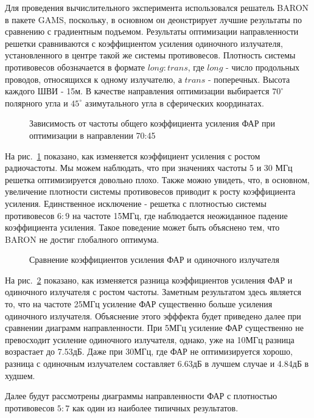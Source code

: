 Для проведения вычислительного эксперимента использовался решатель BARON в пакете GAMS, поскольку, в основном он деонстрирует лучшие результаты по сравнению с градиентным подъемом. Результаты оптимизации направленности решетки сравниваются с коэффициентом усиления одиночного излучателя, установленного в центре такой же системы противовесов. Плотность системы противовесов обозначается в формате $long:trans$, где $long$ - число продольных проводов, относящихся к одному излучателю, а $trans$ - поперечных. Высота каждого ШВИ - 15м. В качестве направления оптимизации выбирается $70^{\circ}$ полярного угла и $45^{\circ}$ азимутального угла в сферических координатах.

\begin{figure}
\caption{Зависимость от частоты общего коэффициента усиления ФАР при оптимизации в направлении 70:45}
\label{ris:paa_gains}
\end{figure}

На рис.~\ref{ris:paa_gains} показано, как изменяется коэффициент усиления с ростом радиочастоты. Мы можем наблюдать, что при значениях частоты 5 и 30 МГц решетка оптимизируется довольно плохо. Также можно увидеть, что, в основном, увеличение плотности системы противовесов приводит к росту коэффициента усиления. Единственное исключение - решетка с плотностью системы противовесов $6:9$ на частоте 15МГц, где наблюдается неожиданное падение коэффициента усиления. Такое поведение может быть объяснено тем, что BARON не достиг глобалного оптимума.

\begin{figure}
\caption{Сравнение коэффициентов усиления ФАР и одиночного излучателя}
\label{ris:all_gains}
\end{figure}

На рис.~\ref{ris:all_gains} показано, как изменяется разница коэффициентов усиления ФАР и одиночного излучателя с ростом частоты. Заметным результатом здесь является то, что на частоте 25МГц усиление ФАР существенно больше усиления одиночного излучателя. Объяснение этого эфффекта будет приведено далее при сравнении диаграмм направленности. При 5МГц усиление ФАР существенно не превосходит усиление одиночного излучателя, однако, уже на 10МГц разница возрастает до 7.53дБ. Даже при 30МГц, где ФАР не оптимизируется хорошо, разница с одиночным излучателем составляет 6.63дБ в лучшем случае и 4.84дБ в худшем.

Далее будут рассмотрены диаграммы направленности ФАР с плотностью противовесов $5:7$ как один из наиболее типичных результатов.

